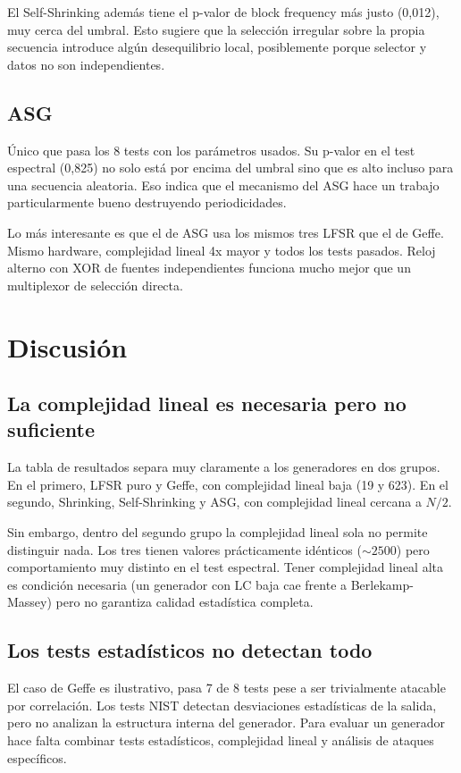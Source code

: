 El Self-Shrinking además tiene el p-valor de block frequency más justo (0,012), muy cerca del umbral.
Esto sugiere que la selección irregular sobre la propia secuencia introduce algún desequilibrio local,
posiblemente porque selector y datos no son independientes.

\subsection{ASG}

Único que pasa los 8 tests con los parámetros usados. Su p-valor en el test espectral (0,825) no solo está por encima del umbral
sino que es alto incluso para una secuencia aleatoria. Eso indica que el mecanismo del ASG hace un trabajo particularmente bueno destruyendo periodicidades.

Lo más interesante es que el de ASG usa los mismos tres LFSR que el de Geffe. Mismo hardware, complejidad lineal 4x mayor y todos los tests pasados.
Reloj alterno con XOR de fuentes independientes funciona mucho mejor que un multiplexor de selección directa.

\section{Discusión}

\subsection{La complejidad lineal es necesaria pero no suficiente}

La tabla de resultados separa muy claramente a los generadores en dos grupos. En el primero, LFSR puro y Geffe,
con complejidad lineal baja (19 y 623). En el segundo, Shrinking, Self-Shrinking y ASG, con complejidad lineal cercana a $N/2$.

Sin embargo, dentro del segundo grupo la complejidad lineal sola no permite distinguir nada.
Los tres tienen valores prácticamente idénticos ($\sim 2500$) pero comportamiento muy distinto en el test espectral.
Tener complejidad lineal alta es condición necesaria (un generador con LC baja cae frente a Berlekamp-Massey) pero no garantiza calidad estadística completa.

\subsection{Los tests estadísticos no detectan todo}

El caso de Geffe es ilustrativo, pasa 7 de 8 tests pese a ser trivialmente atacable por correlación.
Los tests NIST detectan desviaciones estadísticas de la salida, pero no analizan la estructura interna del generador.
Para evaluar un generador hace falta combinar tests estadísticos, complejidad lineal y análisis de ataques específicos.

